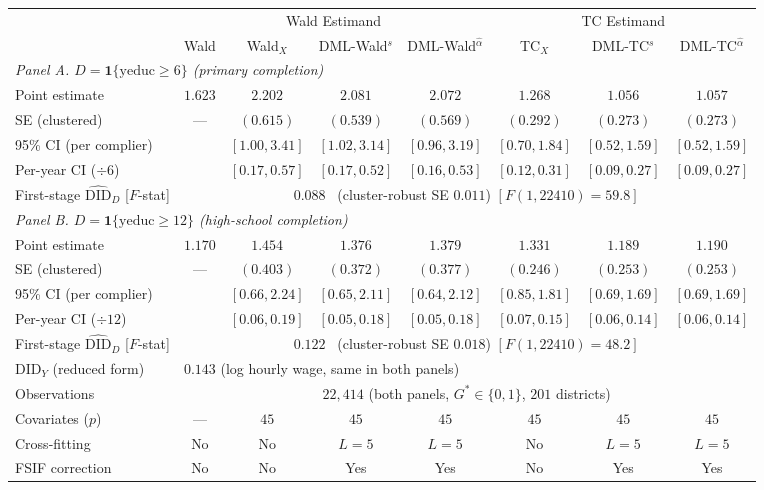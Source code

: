 \begin{tabular}{lccccccc}
\toprule
 & \multicolumn{4}{c}{Wald Estimand} & \multicolumn{3}{c}{TC Estimand} \\
\cmidrule(lr){2-5} \cmidrule(lr){6-8}
 & Wald & Wald$_X$ & DML-Wald$^{s}$ & DML-Wald$^{\hat\alpha}$ & TC$_X$ & DML-TC$^{s}$ & DML-TC$^{\hat\alpha}$ \\
\midrule
\multicolumn{8}{l}{\textit{Panel A. $D = \mathbf{1}\{\text{yeduc} \geq 6\}$ (primary completion)}} \\
\midrule
Point estimate            & $1.623$ & $2.202$ & $2.081$ & $2.072$ & $1.268$ & $1.056$ & $\mathbf{1.057}$ \\
SE (clustered)            & ---     & $(0.615)$ & $(0.539)$ & $(0.569)$ & $(0.292)$ & $(0.273)$ & $(\mathbf{0.273})$ \\
95\% CI (per complier)    &         & $[1.00, 3.41]$ & $[1.02, 3.14]$ & $[0.96, 3.19]$ & $[0.70, 1.84]$ & $[0.52, 1.59]$ & $[\mathbf{0.52, 1.59}]$ \\
Per-year CI ($\div 6$)    &         & $[0.17, 0.57]$ & $[0.17, 0.52]$ & $[0.16, 0.53]$ & $[0.12, 0.31]$ & $[0.09, 0.27]$ & $[\mathbf{0.09, 0.27}]$ \\
First-stage $\widehat{\mathrm{DID}}_D$ [$F$-stat] & \multicolumn{7}{c}{$0.088$ \ (cluster-robust SE $0.011$) \quad $[F(1,22410) = 59.8]$} \\
\midrule
\multicolumn{8}{l}{\textit{Panel B. $D = \mathbf{1}\{\text{yeduc} \geq 12\}$ (high-school completion)}} \\
\midrule
Point estimate            & $1.170$ & $1.454$ & $1.376$ & $1.379$ & $1.331$ & $1.189$ & $\mathbf{1.190}$ \\
SE (clustered)            & ---     & $(0.403)$ & $(0.372)$ & $(0.377)$ & $(0.246)$ & $(0.253)$ & $(\mathbf{0.253})$ \\
95\% CI (per complier)    &         & $[0.66, 2.24]$ & $[0.65, 2.11]$ & $[0.64, 2.12]$ & $[0.85, 1.81]$ & $[0.69, 1.69]$ & $[\mathbf{0.69, 1.69}]$ \\
Per-year CI ($\div 12$)   &         & $[0.06, 0.19]$ & $[0.05, 0.18]$ & $[0.05, 0.18]$ & $[0.07, 0.15]$ & $[0.06, 0.14]$ & $[\mathbf{0.06, 0.14}]$ \\
First-stage $\widehat{\mathrm{DID}}_D$ [$F$-stat] & \multicolumn{7}{c}{$0.122$ \ (cluster-robust SE $0.018$) \quad $[F(1,22410) = 48.2]$} \\
\midrule
$\mathrm{DID}_Y$ (reduced form)  & \multicolumn{7}{l}{$0.143$ (log hourly wage, same in both panels)} \\
Observations                     & \multicolumn{7}{c}{$22{,}414$ (both panels, $G^* \in \{0, 1\}$, $201$ districts)} \\
Covariates ($p$)                 & ---   & $45$  & $45$  & $45$  & $45$  & $45$  & $45$ \\
Cross-fitting                    & No    & No    & $L=5$ & $L=5$ & No    & $L=5$ & $L=5$ \\
FSIF correction                  & No    & No    & Yes   & Yes   & No    & Yes   & Yes \\
\bottomrule
\end{tabular}
